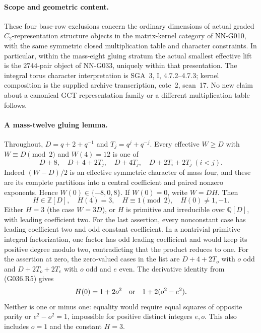 \paragraph{Scope and geometric content.}
These four base-row exclusions concern the ordinary
dimensions of actual graded $C_2$-representation
structure objects in the matrix-kernel category of
NN-G010, with the same symmetric closed multiplication
table and character constraints. In particular, within
the mass-eight gluing stratum the actual smallest
effective lift is the $2744$-pair object of NN-G033,
uniquely within that presentation. The integral torus
character interpretation is SGA~3, I, 4.7.2--4.7.3;
kernel composition is the supplied archive transcription,
cote~2, scan~17. No new claim about a canonical GCT
representation family or a different multiplication
table follows.

\paragraph{A mass-twelve gluing lemma.}
Throughout, $D=q+2+q^{-1}$ and $T_j=q^j+q^{-j}$.
Every effective $W\ge D$ with $W\equiv D\pmod2$ and $W(4)=12$
is one of
\[
 D+8,\quad D+4+2T_j,\quad D+4T_j,\quad
 D+2T_i+2T_j\ (i<j).
\]
Indeed $(W-D)/2$ is an effective symmetric character of mass four,
and these are its complete partitions into a central coefficient
and paired nonzero exponents. Hence $W(0)\in\{-8,0,8\}$.
If $W(0)=0$, write $W=DH$. Then
\[
 H\in\mathbb Z[D],\quad H(4)=3,\quad H\equiv1\pmod2,
 \quad H(0)\ne1,-1.
\]
Either $H=3$ (the case $W=3D$), or $H$ is primitive and
irreducible over $\mathbb Q[D]$, with leading coefficient two.
For the last assertion, every nonconstant case has leading
coefficient two and odd constant coefficient. In a nontrivial
primitive integral factorization, one factor has odd leading
coefficient and would keep its positive degree modulo two,
contradicting that the product reduces to one.
For the assertion at zero, the zero-valued cases in the list are
$D+4+2T_o$ with $o$ odd and $D+2T_o+2T_e$ with $o$ odd and
$e$ even. The derivative identity from (G036.R5) gives
\[
 H(0)=1+2o^2\quad\hbox{or}\quad 1+2(o^2-e^2).
\]
Neither is one or minus one: equality would require equal
squares of opposite parity or $e^2-o^2=1$, impossible for
positive distinct integers $e,o$. This also includes $o=1$
and the constant $H=3$.

